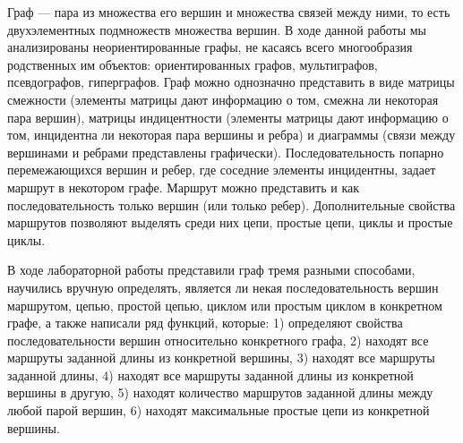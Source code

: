 \documentclass[12pt]{article}
\begin{document}
	Граф --- пара из множества его вершин и множества связей между ними, то есть двухэлементных подмножеств множества вершин. В ходе данной работы мы анализированы неориентированные графы, не касаясь всего многообразия родственных им объектов: ориентированных графов, мультиграфов, псевдографов, гиперграфов. Граф можно однозначно представить в виде матрицы смежности (элементы матрицы дают информацию о том, смежна ли некоторая пара вершин), матрицы индицентности (элементы матрицы дают информацию о том, инцидентна ли некоторая пара вершины и ребра) и диаграммы (связи между вершинами и ребрами представлены графически). Последовательность попарно перемежающихся вершин и ребер, где соседние элементы инцидентны, задает маршрут в некотором графе. Маршрут можно представить и как последовательность только вершин (или только ребер). Дополнительные свойства маршрутов позволяют выделять среди них цепи, простые цепи, циклы и простые циклы.
	
	В ходе лабораторной работы представили граф тремя разными способами, научились вручную определять, является ли некая последовательность вершин маршрутом, цепью, простой цепью, циклом или простым циклом в конкретном графе, а также написали ряд функций, которые: 1) определяют свойства последовательности вершин относительно конкретного графа, 2) находят все маршруты заданной длины из конкретной вершины, 3) находят все маршруты заданной длины, 4) находят все маршруты заданной длины из конкретной вершины в другую, 5) находят количество маршрутов заданной длины между любой парой вершин, 6) находят максимальные простые цепи из конкретной вершины.
\end{document}
